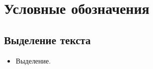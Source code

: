 \section*{Условные обозначения}
\label{sec:legend}

\subsection*{Выделение текста}
\begin{itemize}
    \item[\Rightarrow] Выделение.
\end{itemize}

